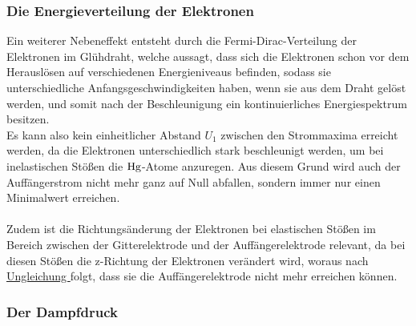 \subsubsection{Die Energieverteilung der Elektronen}
\label{sec:einflüsse:energieverteilung}

    Ein weiterer Nebeneffekt entsteht durch die Fermi-Dirac-Verteilung der Elektronen im Glühdraht,
    welche aussagt,
    dass sich die Elektronen schon vor dem Herauslösen auf verschiedenen Energieniveaus befinden,
    sodass sie unterschiedliche Anfangsgeschwindigkeiten haben,
    wenn sie aus dem Draht gelöst werden,
    und somit nach der Beschleunigung ein kontinuierliches Energiespektrum besitzen.\\
    Es kann also kein einheitlicher Abstand $U_1$ zwischen den Strommaxima erreicht werden,
    da die Elektronen unterschiedlich stark beschleunigt werden,
    um bei inelastischen Stößen die $\ce{Hg}$-Atome anzuregen.
    Aus diesem Grund wird auch der Auffängerstrom nicht mehr ganz auf Null abfallen,
    sondern immer nur einen Minimalwert erreichen.\\
    \\
    Zudem ist die Richtungsänderung der Elektronen bei elastischen Stößen im Bereich zwischen der Gitterelektrode und der Auffängerelektrode relevant,
    da bei diesen Stößen die z-Richtung der Elektronen verändert wird,
    woraus nach \hyperref[eqn:energie_gegenfeld]{Ungleichung } folgt,
    dass sie die Auffängerelektrode nicht mehr erreichen können.


\subsubsection{Der Dampfdruck}
\label{sec:einflüsse:dampfdruck}

